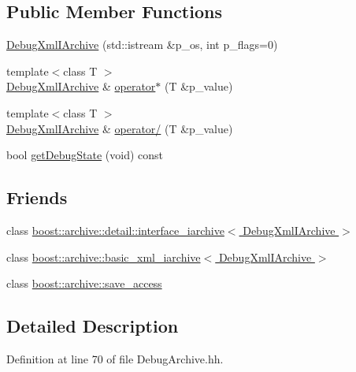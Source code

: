 \subsection*{Public Member Functions}
\begin{DoxyCompactItemize}
\item 
\hyperlink{classxtd_1_1serializer_1_1DebugXmlIArchive_a877cd247551b625bec79846a8b9274d1}{Debug\-Xml\-I\-Archive} (std\-::istream \&p\-\_\-os, int p\-\_\-flags=0)
\item 
{\footnotesize template$<$class T $>$ }\\\hyperlink{classxtd_1_1serializer_1_1DebugXmlIArchive}{Debug\-Xml\-I\-Archive} \& \hyperlink{classxtd_1_1serializer_1_1DebugXmlIArchive_a40060fc623b46cb0332a7ea56b1d9148}{operator$\ast$} (T \&p\-\_\-value)
\item 
{\footnotesize template$<$class T $>$ }\\\hyperlink{classxtd_1_1serializer_1_1DebugXmlIArchive}{Debug\-Xml\-I\-Archive} \& \hyperlink{classxtd_1_1serializer_1_1DebugXmlIArchive_a523764ab4e37ba9cb07dc7d7269ca507}{operator/} (T \&p\-\_\-value)
\item 
bool \hyperlink{classxtd_1_1serializer_1_1DebugXmlIArchive_a40860da9e1a849931364d86b56557357}{get\-Debug\-State} (void) const 
\end{DoxyCompactItemize}
\subsection*{Friends}
\begin{DoxyCompactItemize}
\item 
class \hyperlink{classxtd_1_1serializer_1_1DebugXmlIArchive_a54f75e33da74496cd06e608f4bec85dc}{boost\-::archive\-::detail\-::interface\-\_\-iarchive$<$ Debug\-Xml\-I\-Archive $>$}
\item 
class \hyperlink{classxtd_1_1serializer_1_1DebugXmlIArchive_a54affbd4684171cc9e5cabf2db73ffe5}{boost\-::archive\-::basic\-\_\-xml\-\_\-iarchive$<$ Debug\-Xml\-I\-Archive $>$}
\item 
class \hyperlink{classxtd_1_1serializer_1_1DebugXmlIArchive_aaca003bb8a4fc59424e4025130da4edd}{boost\-::archive\-::save\-\_\-access}
\end{DoxyCompactItemize}


\subsection{Detailed Description}


Definition at line 70 of file Debug\-Archive.\-hh.



